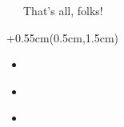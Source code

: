 \documentclass[xetex,18pt,aspectratio=169]{beamer}
\begin{document}
\begin{Large}
\begin{frame}{\ \ \ That's all, folks!}
\begin{textblock*}{\framewidth+0.55cm}(0.5cm,1.5cm)
\begin{itemize}
  \item \href{mailto:alexclear@gmail.com}{\color{linkcolor}{alexclear@gmail.com}}
  \item \href{https://telegram.me/lhommequipleure}{\color{linkcolor}{https://telegram.me/lhommequipleure}}
  \item \href{https://telegram.me/demeliorator\_pod}{\color{linkcolor}{https://telegram.me/demeliorator\_pod}}
\end{itemize}
\end{textblock*}
\end{frame}

\end{Large}
\end{document}
